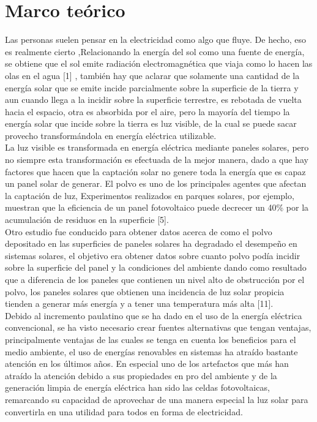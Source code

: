 \chapter{Marco teórico}\label{cap3}
Las personas suelen pensar en la electricidad como algo que fluye. De hecho, eso es realmente cierto ,Relacionando la energía del sol como una fuente de energía, se obtiene que el sol emite radiación electromagnética que viaja como lo hacen las olas en el agua [1] ,  también hay que aclarar que solamente una cantidad de la energía solar que se emite incide parcialmente sobre la superficie de la  tierra y aun cuando llega a la incidir sobre la superficie terrestre, es rebotada de vuelta hacia el espacio, otra es absorbida por el aire, pero la mayoría del tiempo la energía solar que incide sobre la tierra es luz visible, de la cual se puede sacar provecho transformándola  en energía eléctrica utilizable.\\

La luz visible es transformada en energía eléctrica mediante paneles solares, pero no siempre esta transformación es efectuada de la mejor manera, dado a que hay factores que hacen que la captación solar no genere toda la energía que es capaz un panel solar de generar. El polvo es uno de los principales agentes que afectan la captación de luz, Experimentos realizados en parques solares, por ejemplo, muestran que la eficiencia de un panel fotovoltaico puede decrecer un 40\% por la acumulación de residuos en la superficie [5].\\

Otro estudio fue conducido para obtener datos acerca de como el polvo depositado en las superficies de paneles solares ha degradado el desempeño en sistemas solares, el objetivo era obtener datos sobre cuanto polvo podía incidir sobre la superficie del panel y la condiciones del ambiente dando como resultado que a diferencia de los paneles que contienen un nivel alto de obstrucción por el polvo, los paneles solares que obtienen una incidencia de luz solar propicia tienden a generar más energía y a tener una temperatura más alta [11].\\

Debido al incremento paulatino que se ha dado en el uso de la energía eléctrica convencional, se ha visto necesario crear fuentes alternativas que tengan ventajas, principalmente ventajas de las cuales se tenga en cuenta los beneficios para el medio ambiente, el uso de energías renovables en sistemas ha atraído bastante atención en los últimos años. En especial uno de los artefactos que más han atraído la atención debido a sus propiedades en pro del ambiente y de la generación limpia de energía eléctrica han sido las celdas fotovoltaicas, remarcando su capacidad de aprovechar de una manera especial la luz solar para convertirla en una utilidad para todos en forma de electricidad.\\

